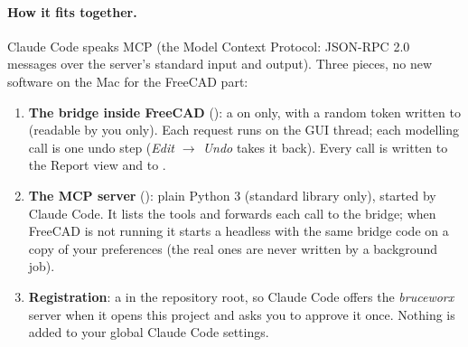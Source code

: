 \paragraph{How it fits together.} Claude Code speaks MCP (the Model Context Protocol: JSON-RPC 2.0 messages over
the server's standard input and output). Three pieces, no new software on the Mac for the FreeCAD part:
\begin{enumerate}[nosep]
  \item \textbf{The bridge inside FreeCAD} (): a 
        on  only, with a random token written to 
        (readable by you only). Each request runs on the GUI thread; each modelling call is one undo step
        (\emph{Edit $\rightarrow$ Undo} takes it back). Every call is written to the Report view and to
        .
  \item \textbf{The MCP server} (): plain Python 3 (standard library
        only), started by Claude Code. It lists the tools and forwards each call to the bridge; when FreeCAD is not
        running it starts a headless  with the same bridge code on a copy of your preferences (the
        real ones are never written by a background job).
  \item \textbf{Registration}: a  in the repository root, so Claude Code offers the
        \emph{bruceworx} server when it opens this project and asks you to approve it once. Nothing is added to
        your global Claude Code settings.
\end{enumerate}

